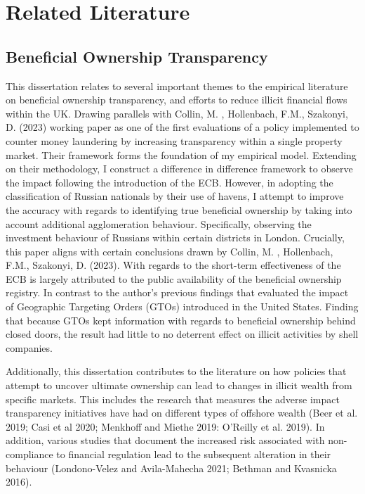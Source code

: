 \documentclass{article}
\begin{document}
\section{Related Literature}
\subsection{Beneficial Ownership Transparency}
This dissertation relates to several important themes to the empirical literature on beneficial ownership transparency, and efforts to reduce illicit financial flows within the UK. Drawing parallels with Collin, M. , Hollenbach, F.M., Szakonyi, D. (2023) working paper as one of the first evaluations of a policy implemented to counter money laundering by increasing transparency within a single property market. Their framework forms the foundation of my empirical model. Extending on their methodology, I construct a difference in difference framework to observe the impact following the introduction of the ECB. However, in adopting the classification of Russian nationals by their use of havens, I attempt to improve the accuracy with regards to identifying true beneficial ownership by taking into account additional agglomeration behaviour. Specifically, observing the investment behaviour of Russians within certain districts in London. Crucially, this paper aligns with certain conclusions drawn by Collin, M. , Hollenbach, F.M., Szakonyi, D. (2023). With regards to the short-term effectiveness of the ECB is largely attributed to the public availability of the beneficial ownership registry. In contrast to the author's previous findings that evaluated the impact of Geographic Targeting Orders (GTOs) introduced in the United States. Finding that because GTOs kept information with regards to beneficial ownership behind closed doors, the result had little to no deterrent effect on illicit activities by shell companies. 

Additionally, this dissertation contributes to the literature on how policies that attempt to uncover ultimate ownership can lead to changes in illicit wealth from specific markets. This includes the research that measures the adverse impact transparency initiatives have had on different types of offshore wealth (Beer et al. 2019; Casi et al 2020; Menkhoff and Miethe 2019: O’Reilly et al. 2019). In addition, various studies that document the increased risk associated with non-compliance to financial regulation lead to the subsequent alteration in their behaviour (Londono-Velez and Avila-Mahecha 2021; Bethman and Kvasnicka 2016).
\end{document}

